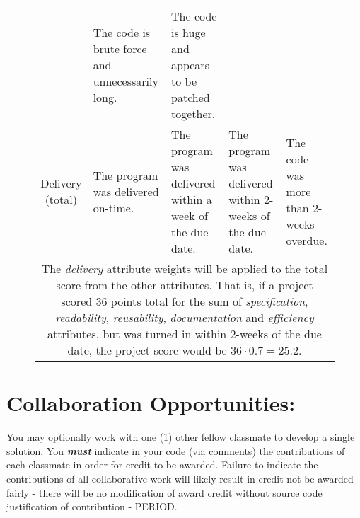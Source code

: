 \documentclass[10pt]{article}
\begin{document}
\begin{figure}
\begin{center}
\begin{tabular}{c p{1.2in} p{1.2in} p{1.2in} p{1.2in}}
                     & The code is brute force and unnecessarily long.
                     & The code is huge and appears to be patched together. \\
      Delivery (total) & The program was delivered on-time.
                       & The program was delivered within a week of the due date. 
                       & The program was delivered within 2-weeks of the due date. 
                       & The code was more than 2-weeks overdue. \\ \hline
      \multicolumn{5}{p{\textwidth}}{The \emph{delivery} attribute weights will be applied to the total score from the other attributes. That is, if a project scored 36 points total for the sum of \emph{specification}, \emph{readability}, \emph{reusability}, \emph{documentation} and \emph{efficiency} attributes, but was turned in within 2-weeks of the due date, the project score would be $36 \cdot 0.7 = 25.2$.}
   \end{tabular}
 \end{center}
\end{figure}

\section*{Collaboration Opportunities:}

You may optionally work with one (1) other fellow classmate to develop a single solution. You \textbf{\emph{must}} indicate in your code (via comments) the contributions of each classmate in order for credit to be awarded. Failure to indicate the contributions of all collaborative work will likely result in credit not be awarded fairly - there will be no modification of award credit without source code justification of contribution - PERIOD.
\end{document}
